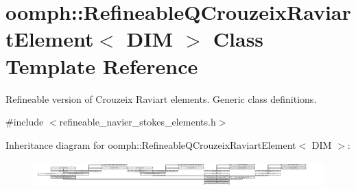 \hypertarget{classoomph_1_1RefineableQCrouzeixRaviartElement}{}\section{oomph\+:\+:Refineable\+Q\+Crouzeix\+Raviart\+Element$<$ D\+IM $>$ Class Template Reference}
\label{classoomph_1_1RefineableQCrouzeixRaviartElement}


Refineable version of Crouzeix Raviart elements. Generic class definitions.  




{\ttfamily \#include $<$refineable\+\_\+navier\+\_\+stokes\+\_\+elements.\+h$>$}

Inheritance diagram for oomph\+:\+:Refineable\+Q\+Crouzeix\+Raviart\+Element$<$ D\+IM $>$\+:\begin{figure}[H]
\begin{center}
\leavevmode
\includegraphics[height=0.989899cm]{classoomph_1_1RefineableQCrouzeixRaviartElement}
\end{center}
\end{figure}
